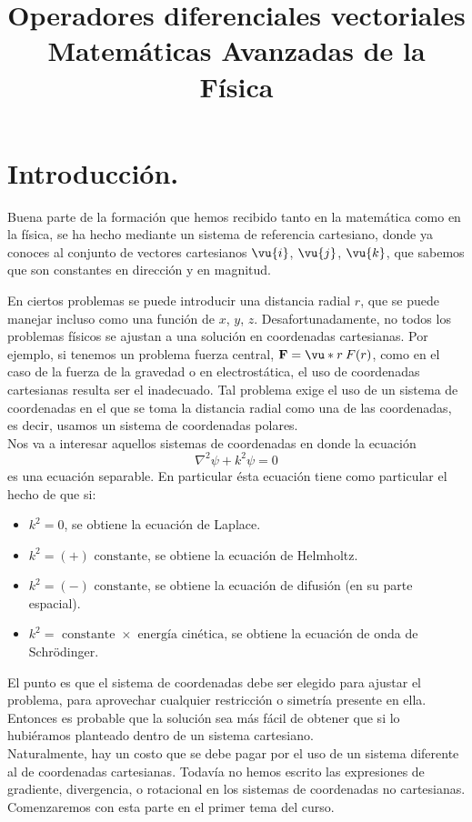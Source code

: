 
\title{Operadores diferenciales vectoriales \\ {\large Matemáticas Avanzadas de la Física}}
\date{ }

\renewcommand\labelenumii{\theenumi.{\arabic{enumii}}}
\maketitle
\fontsize{14}{14}\selectfont
\section{Introducción.}
Buena parte de la formación que hemos recibido tanto en la matemática como en la física, se ha hecho mediante un sistema de referencia cartesiano, donde ya conoces al conjunto de vectores cartesianos $\vu{i}$, $\vu{j}$, $\vu{k}$, que sabemos que son constantes en dirección y en magnitud. 
\par
En ciertos problemas se puede introducir una distancia radial $r$, que se puede manejar incluso como una función de $x$, $y$, $z$. Desafortunadamente, no todos los problemas físicos se ajustan a una solución en coordenadas cartesianas. Por ejemplo, si tenemos un problema fuerza central, $\mathbf{F} = \vu*{r} \: F(r)$, como en el caso de la fuerza de la gravedad o en electrostática, el uso de coordenadas cartesianas resulta ser el inadecuado. Tal problema exige el uso de un sistema de coordenadas en el que se toma la distancia radial como una de las coordenadas, es decir, usamos un sistema de coordenadas polares.
\\
Nos va a interesar aquellos sistemas de coordenadas en donde la ecuación
\[ \nabla^{2} \psi + k^{2} \psi =0 \]
es una ecuación separable.  En particular ésta ecuación tiene como particular el hecho de que si:
\begin{itemize}
\item $k^{2} = 0$, se obtiene la ecuación de Laplace.
\item $k^{2} = (+) \mbox{ constante}$, se obtiene la ecuación de Helmholtz.
\item $k^{2} = (-) \mbox{ constante}$, se obtiene la ecuación de difusión (en su parte espacial).
\item $k^{2} = \mbox{ constante } \times \mbox{ energía cinética}$, se obtiene la ecuación de onda de Schrödinger.
\end{itemize}
El punto es que el sistema de coordenadas debe ser elegido para ajustar el problema, para aprovechar cualquier restricción o simetría presente en ella. Entonces es probable que la solución sea más fácil de obtener que si lo hubiéramos planteado dentro de un sistema cartesiano.
\\
Naturalmente, hay un costo que se debe pagar por el uso de un sistema diferente al de coordenadas cartesianas. Todavía no hemos escrito las expresiones de gradiente, divergencia, o rotacional en los sistemas de coordenadas no cartesianas. Comenzaremos con esta parte en el primer tema del curso.

